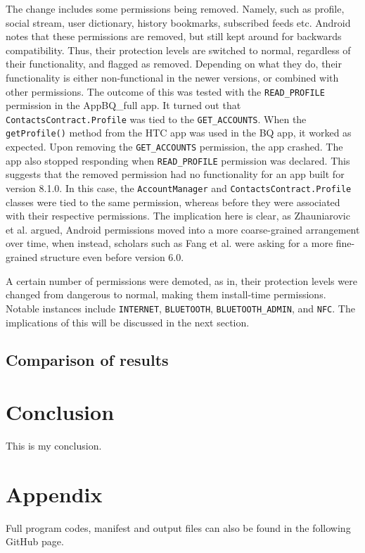 \documentclass[
  a4paper,  %
  twoside,  %
  bibliography=totoc,
  headsepline,
  cleardoublepage=empty,
  parskip=half,
  draft=false,
  open=any
]{scrbook}
\begin{document}
The change includes some permissions being removed. Namely, such as profile, social stream, user dictionary, history bookmarks, subscribed feeds etc. Android notes that these permissions are removed, but still kept around for backwards compatibility. Thus, their protection levels are switched to normal, regardless of their functionality, and flagged as removed. Depending on what they do, their functionality is either non-functional in the newer versions, or combined with other permissions. The outcome of this was tested with the \texttt{READ\_PROFILE} permission in the AppBQ\_full app. It turned out that \texttt{ContactsContract.Profile} was tied to the \texttt{GET\_ACCOUNTS}. When the \texttt{getProfile()} method from the HTC app was used in the BQ app, it worked as expected. Upon removing the \texttt{GET\_ACCOUNTS} permission, the app crashed. The app also stopped responding when \texttt{READ\_PROFILE} permission was declared. This suggests that the removed permission had no functionality for an app built for version 8.1.0. In this case, the \texttt{AccountManager} and \texttt{ContactsContract.Profile} classes were tied to the same permission, whereas before they were associated with their respective permissions. The implication here is clear, as Zhauniarovic et al. argued, Android permissions moved into a more coarse-grained arrangement over time, when instead, scholars such as Fang et al. were asking for a more fine-grained structure even before version 6.0.

A certain number of permissions were demoted, as in, their protection levels were changed from dangerous to normal, making them install-time permissions. Notable instances include \texttt{INTERNET}, \texttt{BLUETOOTH}, \texttt{BLUETOOTH\_ADMIN}, and \texttt{NFC}. The implications of this will be discussed in the next section.

\section{Comparison of results} 

\chapter{Conclusion}
\label{cha:conclusion}


This is my conclusion. 

\printbibliography

\appendix
\chapter{Appendix}
Full program codes, manifest and output files can also be found in the following GitHub page.
\end{document}
